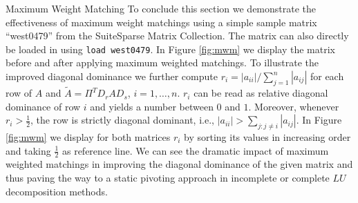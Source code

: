 \begin{example}{Maximum Weight Matching}\label{exm:west0479-match}
To conclude this section we demonstrate the effectiveness of maximum weight matchings using a simple sample matrix ``west0479'' from the SuiteSparse Matrix Collection.
The matrix can also directly be loaded in \ml{} using \texttt{load west0479}.
In Figure \ref{fig:mwm} we display the matrix before and after applying maximum
weighted matchings. To illustrate the improved diagonal dominance we further
compute $r_i=|a_{ii}|/\sum_{j=1}^n|a_{ij}|$ for each row of $A$ and $\tilde A=\Pi^TD_rAD_s$, $i=1,\dots,n$. $r_i$ can be read as relative diagonal dominance of row $i$ 
and yields a number between $0$ and $1$. Moreover, whenever $r_i>\frac12$, the row
is strictly diagonal dominant, i.e., $|a_{ii}|>\sum_{j:j\not=i}|a_{ij}|$.
In Figure \ref{fig:mwm} we display for both matrices $r_i$ by sorting its values
in increasing order and taking $\frac12$ as reference line. We can see the
dramatic impact of maximum weighted matchings in improving the diagonal dominance
of the given matrix and thus paving the way to a static pivoting approach
in incomplete or complete $LU$ decomposition methods.
\end{example}
